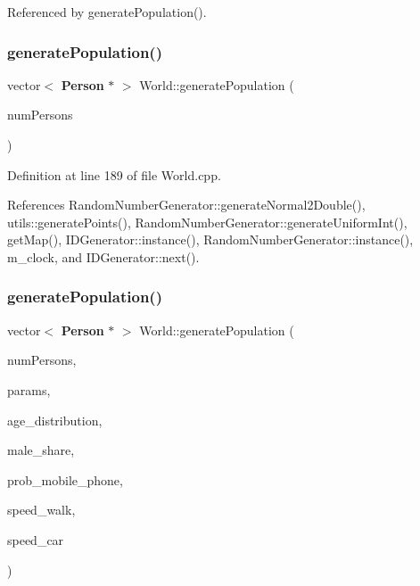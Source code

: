 Referenced by generate\+Population().

\mbox{\label{class_world_a76bc2ffba54afefbb84b2f6fc781b629}} 
\subsubsection{generatePopulation()\hspace{0.1cm}{\footnotesize\ttfamily [1/2]}}
{\footnotesize\ttfamily vector$<$ \textbf{ Person} $\ast$ $>$ World\+::generate\+Population (\begin{DoxyParamCaption}\item[{unsigned long}]{num\+Persons }\end{DoxyParamCaption})\hspace{0.3cm}{\ttfamily [private]}}



Definition at line 189 of file World.\+cpp.



References Random\+Number\+Generator\+::generate\+Normal2\+Double(), utils\+::generate\+Points(), Random\+Number\+Generator\+::generate\+Uniform\+Int(), get\+Map(), I\+D\+Generator\+::instance(), Random\+Number\+Generator\+::instance(), m\+\_\+clock, and I\+D\+Generator\+::next().

\mbox{\label{class_world_ac6bb92d77d6be53323a24b0fd825f986}} 
\subsubsection{generatePopulation()\hspace{0.1cm}{\footnotesize\ttfamily [2/2]}}
{\footnotesize\ttfamily vector$<$ \textbf{ Person} $\ast$ $>$ World\+::generate\+Population (\begin{DoxyParamCaption}\item[{unsigned long}]{num\+Persons,  }\item[{vector$<$ double $>$}]{params,  }\item[{\textbf{ Person\+::\+Age\+Distributions}}]{age\+\_\+distribution,  }\item[{double}]{male\+\_\+share,  }\item[{double}]{prob\+\_\+mobile\+\_\+phone,  }\item[{double}]{speed\+\_\+walk,  }\item[{double}]{speed\+\_\+car }\end{DoxyParamCaption})\hspace{0.3cm}{\ttfamily [private]}}



